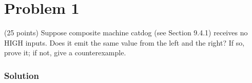 
\section*{Problem 1}
(25 points) Suppose composite machine catdog (see Section 9.4.1) receives no HIGH inputs. 
Does it emit the same value from the left and the right? 
If so, prove it; if not, give a counterexample.

\subsubsection*{Solution}

